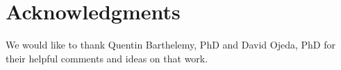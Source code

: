 
\section{Acknowledgments}

We would like to thank Quentin Barthelemy, PhD and David Ojeda, PhD for their helpful comments and ideas on that work. 